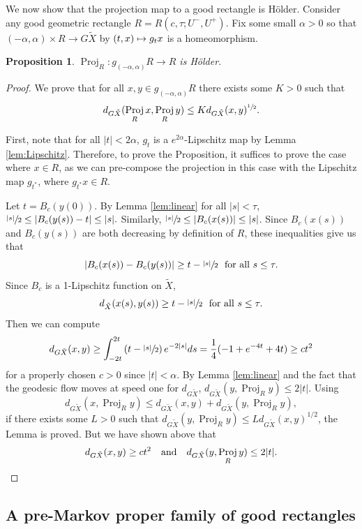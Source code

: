 \documentclass[11pt]{article}
\def\mto{\mathchoice{\longmapsto}{\mapsto}{\mapsto}{\mapsto}}
\newtheorem{prop}[thm]{Proposition}
\theoremstyle{definition}
\numberwithin{equation}{section}
\DeclareMathOperator{\Proj}{Proj}
\begin{document}
We now show that the projection map to a good rectangle is Hölder. Consider any good geometric rectangle $R=R(c,\tau; U^-, U^+)$. Fix some small $\alpha>0$ so that $(-\alpha, \alpha) \times R \to G\tilde X$ by $(t,x) \mto g_t x$ is a homeomorphism.

\begin{prop} \label{projholder}
$\Proj_R:g_{(-\alpha, \alpha)}R \to R$ is Hölder.
\end{prop}

\begin{proof}
We prove that for all $x,y\in g_{(-\alpha, \alpha)}R$ there exists some $K>0$ such that
\[ d_{G\tilde X} (\Proj_Rx, \Proj_Ry) \leq K d_{G\tilde X}(x,y)^{\sfrac{1}{2}}.\]

First, note that for all $|t|<2\alpha$, $g_t$ is a $e^{2\alpha}$-Lipschitz map by Lemma \ref{lem:Lipschitz}. Therefore, to prove the Proposition, it suffices to prove the case where $x\in R$, as we can pre-compose the projection in this case with the Lipschitz map $g_{t^*}$, where $g_{t^*}x\in R$.

Let $t=B_c(y(0))$. By Lemma \ref{lem:linear} for all $|s|<\tau$, $\sfrac{|s|}{2} \leq |B_c(y(s))-t| \leq |s|.$ Similarly, $\sfrac{|s|}{2} \leq |B_c(x(s))| \leq |s|$. Since $B_c(x(s))$ and $B_c(y(s))$ are both decreasing by definition of $R$, these inequalities give us that
\[ |B_c(x(s)) - B_c(y(s))| \geq t-\sfrac{|s|}{2} \ \mbox{ for all } s\leq \tau.\]
Since $B_c$ is a 1-Lipschitz function on $\tilde X$,
\[ d_{\tilde X}(x(s), y(s)) \geq t-\sfrac{|s|}{2} \ \mbox{ for all } s\leq \tau. \]
Then we can compute
\[ d_{G\tilde X}(x,y) \geq \int_{-2t}^{2t} \left(t-\sfrac{|s|}{2}\right) e^{-2|s|} ds = \frac{1}{4}(-1+e^{-4t}+4t) \geq c t^2\]
for a properly chosen $c>0$ since $|t|<\alpha$. By Lemma \ref{lem:linear} and the fact that the geodesic flow moves at speed one for $d_{G\tilde X}$, $d_{G\tilde X}(y,\Proj_Ry) \leq 2|t|$. Using
\[
d_{G\tilde X}(x, \Proj_Ry) \leq d_{G\tilde X}(x,y) + d_{G\tilde X}(y,\Proj_Ry),
\]
if there exists some $L>0$ such that $d_{G\tilde X}(y,\Proj_Ry) \leq Ld_{G\tilde X}(x,y)^{1/2}$, the Lemma is proved. But we have shown above that
\[
d_{G\tilde X}(x,y) \geq ct^2\quad\text{and}\quad d_{G\tilde X} (y, \Proj_Ry)\leq 2|t|.\qedhere
\]
\end{proof}

\subsection{A pre-Markov proper family of good rectangles}\label{sec:good markov}
\end{document}
